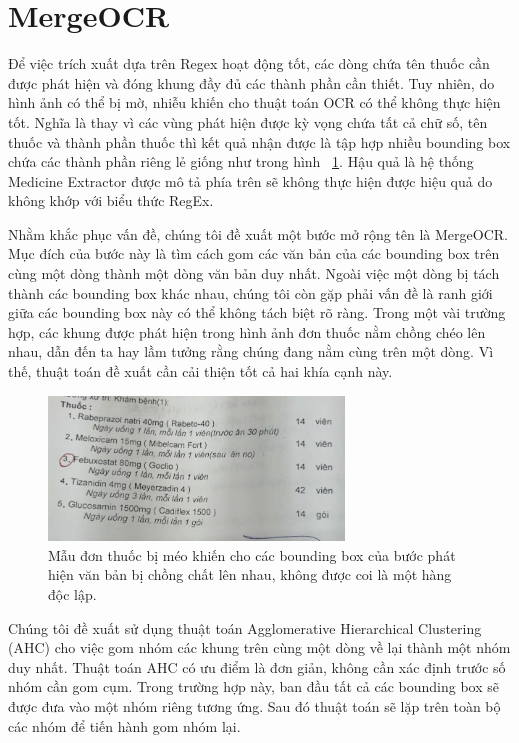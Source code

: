 \section{MergeOCR}

Để việc trích xuất dựa trên Regex hoạt động tốt, các dòng chứa tên thuốc cần được phát hiện và đóng khung đầy đủ các thành phần cần thiết. Tuy nhiên, do hình ảnh có thể bị mờ, nhiễu khiến cho thuật toán OCR có thể không thực hiện tốt. Nghĩa là thay vì các vùng phát hiện được kỳ vọng chứa tất cả chữ số, tên thuốc và thành phần thuốc thì kết quả nhận được là tập hợp nhiều bounding box chứa các thành phần riêng lẻ giống như trong hình ~\ref{mergeocr_1}. Hậu quả là hệ thống Medicine Extractor được mô tả phía trên sẽ không thực hiện được hiệu quả do không khớp với biểu thức RegEx.

Nhằm khắc phục vấn đề, chúng tôi đề xuất một bước mở rộng tên là MergeOCR. Mục đích của bước này là tìm cách gom các văn bản của các bounding box trên cùng một dòng thành một dòng văn bản duy nhất. Ngoài việc một dòng bị tách thành các bounding box khác nhau, chúng tôi còn gặp phải vấn đề là ranh giới giữa các bounding box này có thể không tách biệt rõ ràng. Trong một vài trường hợp, các khung được phát hiện trong hình ảnh đơn thuốc nằm chồng chéo lên nhau, dẫn đến ta hay lầm tưởng rằng chúng đang nằm cùng trên một dòng. Vì thế, thuật toán đề xuất cần cải thiện tốt cả hai khía cạnh này.

\begin{figure}
\centering
\includegraphics[width=0.7\textwidth]{mep_img/mergeocr_1.png}
\caption{Mẫu đơn thuốc bị méo khiến cho các bounding box của bước phát hiện văn bản bị chồng chất lên nhau, không được coi là một hàng độc lập.}\label{mergeocr_1}
\end{figure}

Chúng tôi đề xuất sử dụng thuật toán Agglomerative Hierarchical Clustering (AHC) cho việc gom nhóm các khung trên cùng một dòng về lại thành một nhóm duy nhất. Thuật toán AHC có ưu điểm là đơn giản, không cần xác định trước số nhóm cần gom cụm. Trong trường hợp này, ban đầu tất cả các bounding box sẽ được đưa vào một nhóm riêng tương ứng. Sau đó thuật toán sẽ lặp trên toàn bộ các nhóm để tiến hành gom nhóm lại. 

